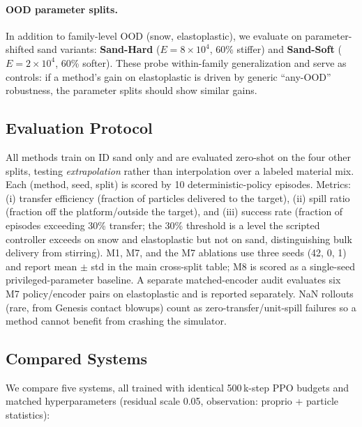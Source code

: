 \paragraph{OOD parameter splits.}
In addition to family-level OOD (snow, elastoplastic), we evaluate on parameter-shifted sand variants: \textbf{Sand-Hard} ($E=8 \times 10^4$, 60\% stiffer) and \textbf{Sand-Soft} ($E=2 \times 10^4$, 60\% softer). These probe within-family generalization and serve as controls: if a method's gain on elastoplastic is driven by generic ``any-OOD'' robustness, the parameter splits should show similar gains.

\subsection{Evaluation Protocol}

All methods train on ID sand only and are evaluated zero-shot on the four other splits, testing \emph{extrapolation} rather than interpolation over a labeled material mix. Each (method, seed, split) is scored by 10 deterministic-policy episodes. Metrics: (i) transfer efficiency (fraction of particles delivered to the target), (ii) spill ratio (fraction off the platform/outside the target), and (iii) success rate (fraction of episodes exceeding 30\% transfer; the 30\% threshold is a level the scripted controller exceeds on snow and elastoplastic but not on sand, distinguishing bulk delivery from stirring). M1, M7, and the M7 ablations use three seeds (42, 0, 1) and report mean $\pm$ std in the main cross-split table; M8 is scored as a single-seed privileged-parameter baseline. A separate matched-encoder audit evaluates six M7 policy/encoder pairs on elastoplastic and is reported separately. NaN rollouts (rare, from Genesis contact blowups) count as zero-transfer/unit-spill failures so a method cannot benefit from crashing the simulator.

\subsection{Compared Systems}

We compare five systems, all trained with identical 500\,k-step PPO budgets and matched hyperparameters (residual scale 0.05, observation: proprio + particle statistics):

